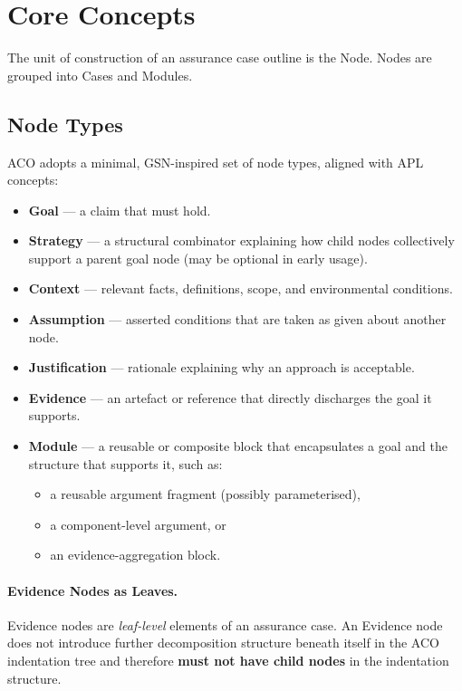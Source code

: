 \documentclass[11pt]{article}
\begin{document}
\section{Core Concepts}
The unit of construction of an assurance case outline is the Node.
Nodes are grouped into Cases and Modules.

\subsection{Node Types}

ACO adopts a minimal, GSN-inspired set of node types, aligned with APL concepts:

\begin{itemize}[leftmargin=2em]
  \item \textbf{Goal} --- a claim that must hold.
  \item \textbf{Strategy} --- a structural combinator explaining how child nodes collectively
        support a parent goal node (may be optional in early usage).
  \item \textbf{Context} --- relevant facts, definitions, scope, and environmental conditions.
  \item \textbf{Assumption} --- asserted conditions that are taken as given about another node.
  \item \textbf{Justification} --- rationale explaining why an approach is acceptable.
  \item \textbf{Evidence} --- an artefact or reference that directly discharges the goal it
        supports.
  \item \textbf{Module} --- a reusable or composite block that encapsulates a goal and the
        structure that supports it, such as:
  \begin{itemize}[leftmargin=1.5em]
    \item a reusable argument fragment (possibly parameterised),
    \item a component-level argument, or
    \item an evidence-aggregation block.
  \end{itemize}
\end{itemize}

\paragraph{Evidence Nodes as Leaves.}
Evidence nodes are \emph{leaf-level} elements of an assurance case. An Evidence node
does not introduce further decomposition structure beneath itself in the ACO indentation tree and therefore
\textbf{must not have child nodes} in the indentation structure.
\end{document}
